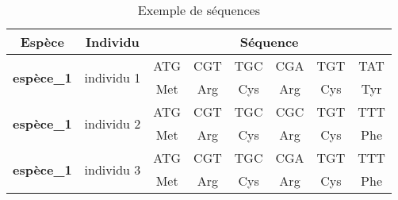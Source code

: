 \documentclass[../main]{subfiles} %
\begin{document}


\begin{table}[]
    \centering
    \begin{tabular}{cccccccc}
        \toprule
        \textbf{Espèce}                     & \textbf{Individu}             & \multicolumn{6}{c}{\textbf{Séquence}} \\
        \midrule
        \multirow{2}{*}{\textbf{espèce\_1}} & \multirow{2}{*}{individu 1}   & ATG  & CGT  & TGC  & CGA  & TGT & TAT \\
                                            &                               & Met  & Arg  & Cys  & Arg  & Cys  & Tyr \\
        \midrule
        \multirow{2}{*}{\textbf{espèce\_1}} & \multirow{2}{*}{individu 2}   & ATG  & CGT  & TGC  & CGC  & TGT & TTT \\
                                            &                               & Met  & Arg  & Cys  & Arg  & Cys  & Phe \\
        \midrule
        \multirow{2}{*}{\textbf{espèce\_1}} & \multirow{2}{*}{individu 3}   & ATG  & CGT  & TGC  & CGA  & TGT & TTT \\
                                            &                               & Met  & Arg  & Cys  & Arg  & Cys  & Phe \\
        \bottomrule
    \end{tabular}


    \scriptsize \caption{Exemple de séquences}
    \label{tab:seqEx1}
\end{table}
\end{document}
